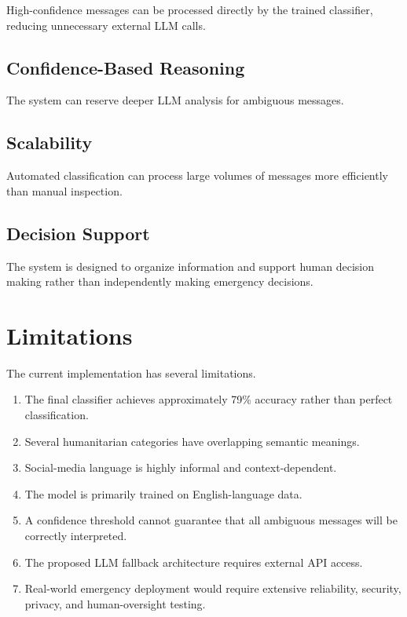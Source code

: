\documentclass[12pt,a4paper]{article}
\begin{document}
High-confidence messages can be processed directly by the trained classifier,
reducing unnecessary external LLM calls.

\subsection{Confidence-Based Reasoning}

The system can reserve deeper LLM analysis for ambiguous messages.

\subsection{Scalability}

Automated classification can process large volumes of messages more
efficiently than manual inspection.

\subsection{Decision Support}

The system is designed to organize information and support human decision
making rather than independently making emergency decisions.

\section{Limitations}

The current implementation has several limitations.

\begin{enumerate}
    \item The final classifier achieves approximately 79\% accuracy rather
    than perfect classification.
    
    \item Several humanitarian categories have overlapping semantic meanings.
    
    \item Social-media language is highly informal and context-dependent.
    
    \item The model is primarily trained on English-language data.
    
    \item A confidence threshold cannot guarantee that all ambiguous messages
    will be correctly interpreted.
    
    \item The proposed LLM fallback architecture requires external API access.
    
    \item Real-world emergency deployment would require extensive reliability,
    security, privacy, and human-oversight testing.
\end{enumerate}
\end{document}
